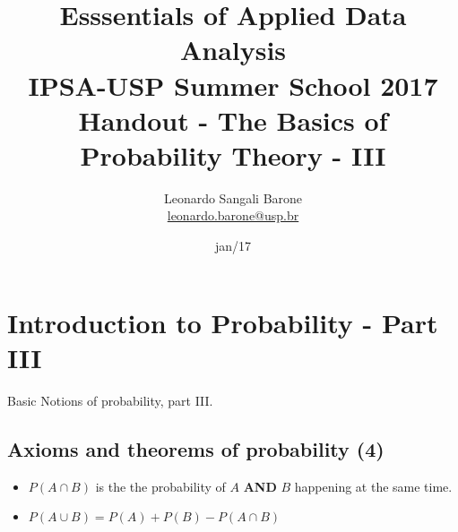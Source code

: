 \documentclass[11pt]{article}
\title{\textbf{Esssentials of Applied Data Analysis\\
				IPSA-USP Summer School 2017}\newline\\
				Handout - The Basics of Probability Theory - III}
\author{Leonardo Sangali Barone\\ \href{leonardo.barone@usp.br}{leonardo.barone@usp.br}}
\date{jan/17}
\begin{document}
\maketitle

\section*{Introduction to Probability - Part III}

	Basic Notions of probability, part III.

	\subsection*{Axioms and theorems of probability (4)}
	\begin{itemize}
		\item $P(A \cap B)$ is the the probability of $A$ \textbf{AND} $B$ happening at the same time.																																																																																																																		
		\item  $P(A \cup B) = P(A) + P(B) - P(A \cap B)$ 
	\end{itemize}
\end{document}
